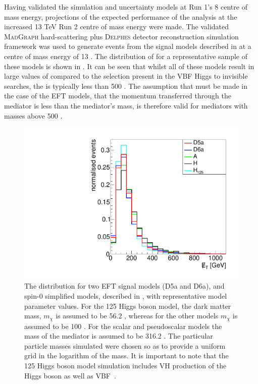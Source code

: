 Having validated the simulation and uncertainty models at Run 1's 8 \TeV centre of mass energy, projections of the expected performance of the analysis at the increased 13 TeV Run 2 centre of mass energy were made. The validated \textsc{MadGraph} hard-scattering plus \textsc{Delphes} detector reconstruction simulation framework was used to generate events from the signal models described in  at a centre of mass energy of 13 \TeV. The distribution of \MET for a representative sample of these models is shown in . It can be seen that whilst all of these models result in large values of \MET compared to the selection present in the \ac{VBF} Higgs to invisible searches, the \MET is typically less than 500 \GeV. The assumption that must be made in the case of the \ac{EFT} models, that the momentum transferred through the mediator is less than the mediator's mass, is therefore valid for mediators with masses above 500 \GeV.

\begin{figure}
  \includegraphics[width=\largefigwidth]{plots/interp/modelmet.pdf}
  \caption{The \MET distribution for two EFT signal models (D5a and D6a), and spin-0 simplified models, described in , with representative model parameter values. For the 125 \GeV Higgs boson model, the dark matter mass, $m_{\chi}$ is assumed to be 56.2 \GeV, whereas for the other models $m_{\chi}$ is assumed to be 100 \GeV . For the scalar and pseudoscalar models the mass of the mediator is assumed to be 316.2 \GeV. The particular particle masses simulated were chosen so as to provide a uniform grid in the logarithm of the mass. It is important to note that the 125 \GeV Higgs boson model simulation includes VH production of the Higgs boson as well as VBF~\cite{ourdmpaper}.}
  \label{fig:dmmodelkinematics}
\end{figure}

